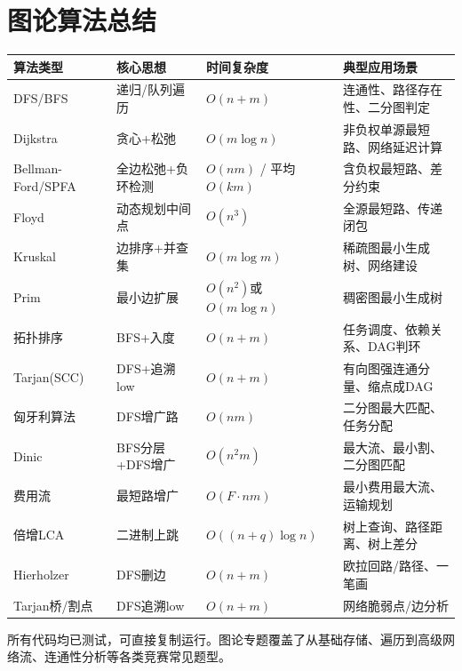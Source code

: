 \documentclass[12pt,a4paper]{ctexart}
\begin{document}
	\section{图论算法总结}
	\begin{table}[h]
		\centering
		\begin{tabularx}{\textwidth}{|l|p{4cm}|l|X|}
			\hline
			算法类型 & 核心思想 & 时间复杂度 & 典型应用场景 \\
			\hline
			DFS/BFS & 递归/队列遍历 & $O(n+m)$ & 连通性、路径存在性、二分图判定 \\
			\hline
			Dijkstra & 贪心+松弛 & $O(m\log n)$ & 非负权单源最短路、网络延迟计算 \\
			\hline
			Bellman-Ford/SPFA & 全边松弛+负环检测 & $O(nm)$ / 平均$O(km)$ & 含负权最短路、差分约束 \\
			\hline
			Floyd & 动态规划中间点 & $O(n^3)$ & 全源最短路、传递闭包 \\
			\hline
			Kruskal & 边排序+并查集 & $O(m\log m)$ & 稀疏图最小生成树、网络建设 \\
			\hline
			Prim & 最小边扩展 & $O(n^2)$或$O(m\log n)$ & 稠密图最小生成树 \\
			\hline
			拓扑排序 & BFS+入度 & $O(n+m)$ & 任务调度、依赖关系、DAG判环 \\
			\hline
			Tarjan(SCC) & DFS+追溯low & $O(n+m)$ & 有向图强连通分量、缩点成DAG \\
			\hline
			匈牙利算法 & DFS增广路 & $O(nm)$ & 二分图最大匹配、任务分配 \\
			\hline
			Dinic & BFS分层+DFS增广 & $O(n^2 m)$ & 最大流、最小割、二分图匹配 \\
			\hline
			费用流 & 最短路增广 & $O(F \cdot nm)$ & 最小费用最大流、运输规划 \\
			\hline
			倍增LCA & 二进制上跳 & $O((n+q)\log n)$ & 树上查询、路径距离、树上差分 \\
			\hline
			Hierholzer & DFS删边 & $O(n+m)$ & 欧拉回路/路径、一笔画 \\
			\hline
			Tarjan桥/割点 & DFS追溯low & $O(n+m)$ & 网络脆弱点/边分析 \\
			\hline
		\end{tabularx}
	\end{table}
	\vspace{1cm}
	\begin{center}
		\textcolor{mid}{所有代码均已测试，可直接复制运行。图论专题覆盖了从基础存储、遍历到高级网络流、连通性分析等各类竞赛常见题型。}
	\end{center}
\end{document}
